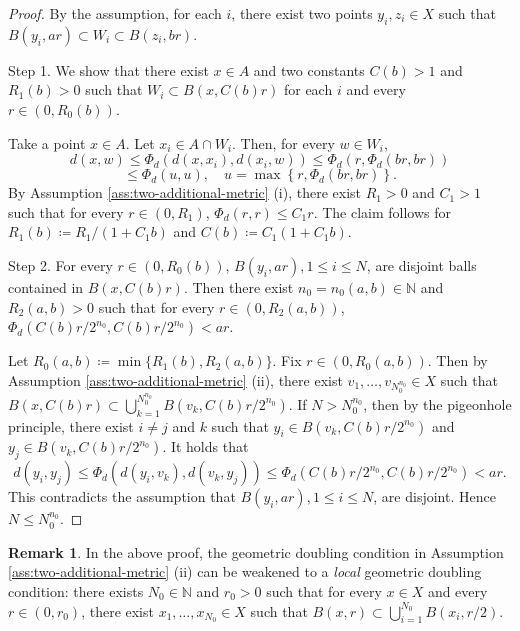 \documentclass[a4paper, reqno, 11pt]{amsart}
\theoremstyle{definition}
\newtheorem{Rem}[Thm]{Remark}
\begin{document}
\begin{proof}
By the assumption, for each $i$, there exist two points $y_i, z_i \in X$ such that $B(y_i, ar) \subset W_i \subset B(z_i, br)$. 

Step 1. We show that there exist $x \in A$  and  two constants $C(b) >  1$ and $R_1 (b) > 0$ such that $W_i \subset B(x, C(b) r)$ for each $i$ and every $r \in (0, R_0 (b))$. 

Take a point $x \in A$. 
Let $x_i \in A \cap W_i$.   
Then, for every $w \in W_i$, 
\[ d(x,w) \le \Phi_d (d(x,x_i), d(x_i,w)) \le \Phi_d \left(r, \Phi_d (br, br)\right)\]
\[  \le  \Phi_d \left(u,  u\right), \quad u = \max\left\{r, \Phi_d (br,br)\right\}. \]
By Assumption \ref{ass:two-additional-metric} (i), 
there exist $R_1 > 0$ and $C_1 > 1$ such that for every $r \in (0, R_1)$, $\Phi_d (r,r) \le C_1 r$. 
The claim follows for $R_1 (b) \coloneqq R_1/(1+ C_1 b)$ and $C(b) \coloneqq C_1 (1+ C_1 b) $. 

Step 2. For every $r \in (0, R_0 (b))$, $B(y_i, ar), 1 \le i \le N$, are disjoint balls  contained in $B(x, C(b) r)$. 
Then there exist $n_0 = n_0 (a,b) \in \mathbb{N}$ and $R_2 (a,b) > 0$ such that for every $r \in (0, R_2 (a,b))$,  $\Phi_d (C(b) r/2^{n_0}, C(b) r/2^{n_0}) < ar$. 

Let $R_0 (a,b) \coloneqq \min\{R_1 (b), R_2 (a,b) \}$. 
Fix $r \in \left(0, R_0 (a,b)\right)$. 
Then by Assumption \ref{ass:two-additional-metric} (ii), 
there exist $v_1, \dots, v_{N_0^{n_0}} \in X$ such that $B(x,C(b)r) \subset \bigcup_{k=1}^{N_0^{n_0}} B(v_k, C(b) r/2^{n_0})$. 
If $N > N_0^{n_0}$, then by the pigeonhole principle, there exist $i \ne j$ and $k$ such that $y_i \in B(v_k, C(b) r/2^{n_0})$ and $y_j \in B(v_k, C(b) r/2^{n_0})$. 
It holds that 
\[  d(y_i, y_j) \le \Phi_d (d(y_i, v_k), d(v_k, y_j)) \le \Phi_d (C(b) r/2^{n_0}, C(b) r/2^{n_0}) < ar. \]
This contradicts the assumption that $B(y_i, ar), 1 \le i \le N$, are disjoint. 
Hence $N \le N_0^{n_0}$. 
\end{proof}

\begin{Rem}
In the above proof, the geometric doubling condition in Assumption \ref{ass:two-additional-metric} (ii) can be weakened to a {\it local} geometric doubling condition: 
there exists $N_0 \in \mathbb{N}$ and $r_0 > 0$ such that for every $x \in X$ and every $r \in (0, r_0)$, there exist $x_1, \dots, x_{N_0} \in X$ such that $B(x,r) \subset \bigcup_{i=1}^{N_0} B(x_i, r/2)$. 
\end{Rem}
\end{document}
